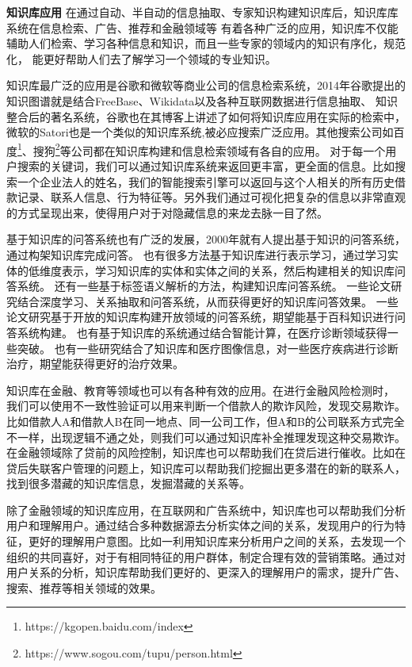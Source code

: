 \textbf{知识库应用}
在通过自动、半自动的信息抽取、专家知识构建知识库后，知识库库系统在信息检索、广告、推荐和金融领域等
有着各种广泛的应用，知识库不仅能辅助人们检索、学习各种信息和知识，而且一些专家的领域内的知识有序化，规范化，
能更好帮助人们去了解学习一个领域的专业知识。

知识库最广泛的应用是谷歌和微软等商业公司的信息检索系统，2014年谷歌提出的知识图谱\cite{Dong2014KnowledgeVA}就是结合FreeBase、Wikidata以及各种互联网数据进行信息抽取、
知识整合后的著名系统，谷歌也在其博客上讲述了如何将知识库应用在实际的检索中，
微软的Satori也是一个类似的知识库系统,被必应搜索广泛应用。其他搜索公司如百度\footnote{https://kgopen.baidu.com/index}、搜狗\footnote{https://www.sogou.com/tupu/person.html}等公司都在知识库构建和信息检索领域有各自的应用。
对于每一个用户搜索的关键词，我们可以通过知识库系统来返回更丰富，更全面的信息。比如搜索一个企业法人的姓名，我们的智能搜索引擎可以返回与这个人相关的所有历史借款记录、联系人信息、行为特征等。另外我们通过可视化把复杂的信息以非常直观的方式呈现出来，使得用户对于对隐藏信息的来龙去脉一目了然。

基于知识库的问答系统也有广泛的发展，2000年就有人提出基于知识的问答系统\cite{HERMJAKOB2000KnowledgeBasedQA}，通过构架知识库完成问答。
也有很多方法基于知识库进行表示学习\cite{Yang2014JointRE}，通过学习实体的低维度表示，学习知识库的实体和实体之间的关系，然后构建相关的知识库问答系统。
还有一些基于标签语义解析的方法，构建知识库问答系统\cite{Yih2016TheVO}。
一些论文\cite{Yu2017ImprovedNR}研究结合深度学习、关系抽取和问答系统，从而获得更好的知识库问答效果。
一些论文\cite{KeySun2016OpenKB}研究基于开放的知识库构建开放领域的问答系统，期望能基于百科知识进行问答系统构建。
也有基于知识库的系统通过结合智能计算\cite{Pandey2009KnowledgeAI}，在医疗诊断领域获得一些突破。
也有一些研究结合了知识库和医疗图像信息\cite{Halpern2014EvaluationOC}，对一些医疗疾病进行诊断治疗，期望能获得更好的治疗效果。

知识库在金融、教育等领域也可以有各种有效的应用。在进行金融风险检测时，
我们可以使用不一致性验证可以用来判断一个借款人的欺诈风险，发现交易欺诈。比如借款人A和借款人B在同一地点、同一公司工作，但A和B的公司联系方式完全不一样，出现逻辑不通之处，则我们可以通过知识库补全推理发现这种交易欺诈。在金融领域除了贷前的风险控制，知识库也可以帮助我们在贷后进行催收。比如在贷后失联客户管理的问题上，知识库可以帮助我们挖掘出更多潜在的新的联系人，找到很多潜藏的知识库信息，发掘潜藏的关系等。

除了金融领域的知识库应用，在互联网和广告系统中，知识库也可以帮助我们分析用户和理解用户。通过结合多种数据源去分析实体之间的关系，发现用户的行为特征，更好的理解用户意图。比如一利用知识库来分析用户之间的关系，去发现一个组织的共同喜好，对于有相同特征的用户群体，制定合理有效的营销策略。通过对用户关系的分析，知识库帮助我们更好的、更深入的理解用户的需求，提升广告、搜索\cite{Liu2005KnowledgebasedQE}、推荐\cite{Burke2000KnowledgebasedRS}等相关领域的效果。

